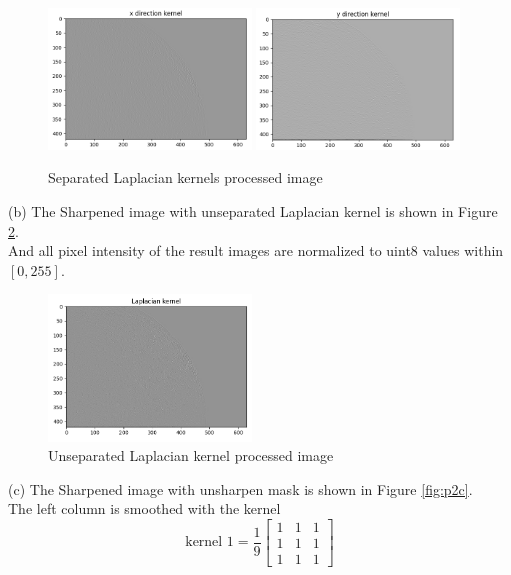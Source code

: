 \begin{figure}[htbp]
    \centering
	\includegraphics[width=0.48\textwidth]{../images/p2/p2a_x_direction.png}
	\includegraphics[width=0.48\textwidth]{../images/p2/p2a_y_direction.png}
    \caption{Separated Laplacian kernels processed image}
\label{fig:p2a}
\end{figure}


(b) The Sharpened image with unseparated Laplacian kernel is shown in Figure \ref{fig:p2b}.\\
And all pixel intensity of the result images are normalized to uint8 values within $[0,255]$.\\

\begin{figure}[htbp]
    \centering
	\includegraphics[width=0.48\textwidth]{../images/p2/p2b_Laplacian.png}
    \caption{Unseparated Laplacian kernel processed image}
\label{fig:p2b}
\end{figure}

(c) The Sharpened image with unsharpen mask is shown in Figure \ref{fig:p2c}.\\
The left column is smoothed with the kernel 
$$\text{kernel\ 1}=\dfrac{1}{9}\begin{bmatrix}1 & 1 & 1\\1 & 1 & 1\\1 & 1 & 1\end{bmatrix}$$

